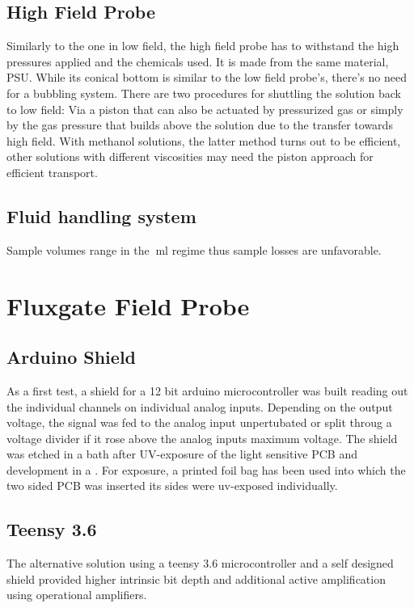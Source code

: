         \subsection{High Field Probe}
            Similarly to the one in low field, the high field probe has to withstand the high
            pressures applied and the chemicals used. It is made from the same material, PSU. While
            its conical bottom is similar to the low field probe's, there's no need for a bubbling
            system. There are two procedures for shuttling the solution back to low field: Via a
            piston that can also be actuated by pressurized gas or simply by the gas pressure that
            builds above the solution due to the transfer towards high field. With methanol
            solutions, the latter method turns out to be efficient, other solutions with different
            viscosities may need the piston approach for efficient transport.
        \subsection{Fluid handling system} 
            Sample volumes range in the $\SI{}{\milli\litre}$ regime thus sample losses are
            unfavorable.
    \section{Fluxgate Field Probe}\label{sec:methodsFluxgate}
        \subsection{Arduino Shield}
        As a first test, a shield for a 12 bit arduino microcontroller was built reading out the individual channels on individual analog inputs. Depending on the output voltage, the signal was fed to the analog input unpertubated or split throug a voltage divider if it rose above the analog inputs maximum voltage. The shield was etched in a  bath after UV-exposure of the light sensitive PCB and development in a . For exposure, a printed foil bag has been used into which the two sided PCB was inserted  its sides were uv-exposed individually.
        \subsection{Teensy 3.6}
        The alternative solution using a teensy 3.6 microcontroller and a self designed shield provided higher intrinsic bit depth and additional active amplification using operational amplifiers.
%

